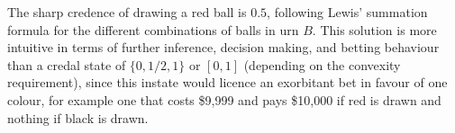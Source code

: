 \documentclass[11pt]{article}
\begin{document}
The sharp credence of drawing a red ball is $0.5$, following Lewis'
summation formula for the different combinations of balls in urn $B$.
This solution is more intuitive in terms of further inference,
decision making, and betting behaviour than a credal state of
$\{0,1/2,1\}$ or $[0,1]$ (depending on the convexity requirement),
since this instate would licence an exorbitant bet in favour of one
colour, for example one that costs \$9,999 and pays \$10,000 if red is
drawn and nothing if black is drawn.

 

\end{document}
